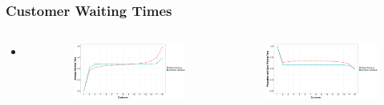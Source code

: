 \documentclass{beamer}
\begin{document}
\begin{frame}
	\frametitle{Customer Waiting Times}

	\begin{columns}
		
		\begin{itemize}
			\item
		\end{itemize}
		
		
		\begin{figure}
			\centering
			\includegraphics[width=\textwidth]{WT_Line_Avg.eps}
		\end{figure}

		\begin{figure}
			\centering
			\includegraphics[width=\textwidth]{WT_Line_Prop.eps}
		\end{figure}
	\end{columns}
\end{frame}
\end{document}
